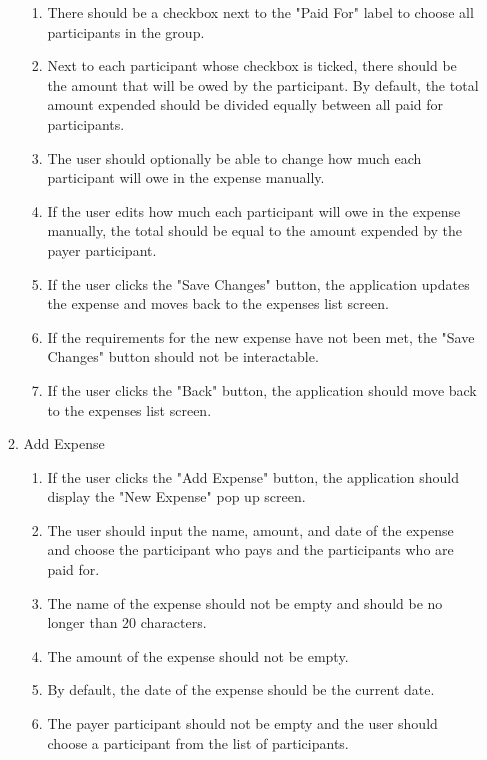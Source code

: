 \documentclass[conference]{IEEEtran}
\begin{document}
\begin{enumerate}
\begin{enumerate}
\begin{enumerate}
                        \item There should be a checkbox next to the "Paid For" label to choose all participants in the group.
                        \item Next to each participant whose checkbox is ticked, there should be the amount that will be owed by the participant. By default, the total amount expended should be divided equally between all paid for participants.
                        \item The user should optionally be able to change how much each participant will owe in the expense manually.
                        \item If the user edits how much each participant will owe in the expense manually, the total should be equal to the amount expended by the payer participant.
                        \item If the user clicks the "Save Changes" button, the application updates the expense and moves back to the expenses list screen.
                        \item If the requirements for the new expense have not been met, the "Save Changes" button should not be interactable.
                        \item If the user clicks the "Back" button, the application should move back to the expenses list screen.
                    \end{enumerate}
                \item Add Expense
                    \begin{enumerate}
                        \item If the user clicks the "Add Expense" button, the application should display the "New Expense" pop up screen.
                        \item The user should input the name, amount, and date of the expense and choose the participant who pays and the participants who are paid for.
                        \item The name of the expense should not be empty and should be no longer than 20 characters.
                        \item The amount of the expense should not be empty.
                        \item By default, the date of the expense should be the current date.
                        \item The payer participant should not be empty and the user should choose a participant from the list of participants.

\end{enumerate}
\end{enumerate}
\end{enumerate}
\end{document}
